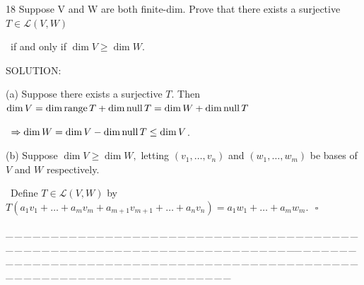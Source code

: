\documentclass[a4paper, 11pt, UTF8]{article}
\def\range{\textup{range}\,}
\def\null{\textup{null\,}}
\def\Lm{\mathcal{L}}
\begin{document}
\begin{large}
{\timesbf\Large 18} {\timessl\Large 
Suppose V and W are both finite-dim. Prove that there exists a surjective $T\in\Lm(V,W)$}\par\quad\,
{\timessl\Large if and only if $\dim V\geq\dim W$.
}\par
{\timesbf S\footnotesize{OLUTION:}}\par\quad
(a) Suppose there exists a surjective $T$. Then $\dim V=\dim\range T+\dim\null T=\dim W+\dim\null T$\par\qquad\,
$\Rightarrow\dim W=\dim V-\dim\null T\leq\dim V$.\par\quad
(b) Suppose $\dim V\geq\dim W,$ letting $(v_1,\dots,v_n)$ and $(w_1,\dots,w_m)$ be bases of $V$ and $W$ respectively.\par\qquad\, Define $T\in\Lm(V,W)$ by $T(a_1 v_1+\dots+a_m v_m+a_{m+1} v_{m+1}+\dots+a_n v_n)=a_1 w_1+\dots+a_m w_m.\,\,\,\,\square$\par
{\tiny \_\,\_\,\_\,\_\,\_\,\_\,\_\,\_\,\_\,\_\,\_\,\_\,\_\,\_\,\_\,\_\,\_\,\_\,\_\,\_\,\_\,\_\,\_\,\_\,\_\,\_\,\_\,\_\,\_\,\_\,\_\,\_\,\_\,\_\,\_\,\_\,\_\,\_\,\_\,\_\,\_\,\_\,\_\,\_\,\_\,\_\,\_\,\_\,\_\,\_\,\_\,\_\,\_\,\_\,\_\,\_\,\_\,\_\,\_\,\_\,\_\,\_\,\_\,\_\,\_\,\_\,\_\,\_\,\_\,\_\,\_\_\,\_\,\_\,\_\,\_\,\_\,\_\,\_\,\_\,\_\,\_\,\_\,\_\,\_\,\_\,\_\,\_\,\_\,\_\,\_\,\_\,\_\,\_\,\_\,\_\,\_\,\_\,\_\,\_\,\_\,\_\,\_\,\_\,\_\,\_\,\_\,\_\,\_\,\_\,\_\,\_\,\_\,\_\,\_\,\_\,\_\,\_\,\_\,\_\,\_\,\_\,\_\,\_\,\_\,\_\,\_\,\_\,\_\,\_\,\_\,\_\,\_\,\_\,\_\,\_\,\_\,\_\,\_\,\_\,\_\,\_}\par


\end{large}
\end{document}
